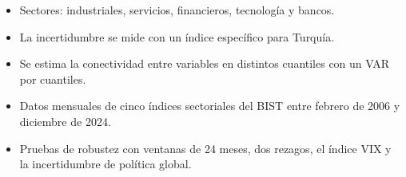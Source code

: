 \documentclass{article}
\newcommand{\cardtitlesize}{\fontsize{35.4}{42.5}\selectfont}
\newcommand{\cardtitle}[2][navy]{{\color{#1}\cardtitlesize\bfseries\textls[110]{\MakeUppercase{#2}}}\par\vspace{7mm}}
\begin{document}
\vfill
\hspace*{34mm}\begin{minipage}{773mm}
\begin{tcolorbox}[card]\cardtitle{Metodología}
\begin{minipage}[t]{0.48\linewidth}
\begin{itemize}
\item Sectores: industriales, servicios, financieros, tecnología y bancos.
\item La incertidumbre se mide con un índice específico para Turquía.
\item Se estima la conectividad entre variables en distintos cuantiles con un VAR por cuantiles.
\end{itemize}
\end{minipage}\hfill
\begin{minipage}[t]{0.48\linewidth}
\begin{itemize}
\item Datos mensuales de cinco índices sectoriales del BIST entre febrero de 2006 y diciembre de 2024.
\item Pruebas de robustez con ventanas de 24 meses, dos rezagos, el índice VIX y la incertidumbre de política global.
\end{itemize}
\end{minipage}
\end{tcolorbox}
\end{minipage}
\end{document}
